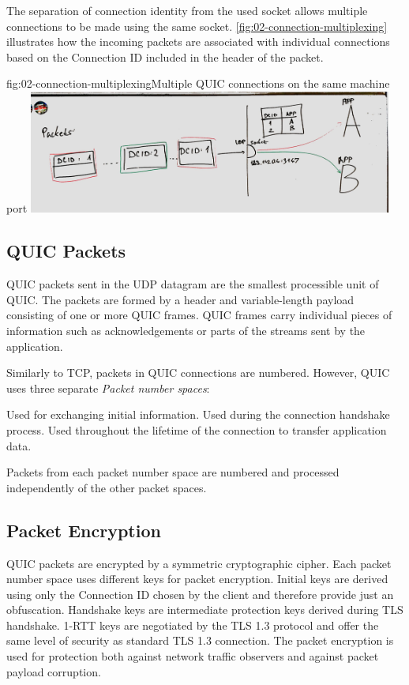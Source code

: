 The separation of connection identity from the used socket allows multiple connections to be made
using the same socket. \autoref{fig:02-connection-multiplexing} illustrates how the incoming
packets are associated with individual connections based on the Connection ID included in the header
of the packet.

\begin{myFigure}{fig:02-connection-multiplexing}{Multiple QUIC connections on the same machine port}
  \includegraphics[width=0.9\textwidth]{img/02-socket-multiplexing}
\end{myFigure}

\subsection{QUIC Packets}

QUIC packets sent in the UDP datagram are the smallest processible unit of QUIC\@. The packets are
formed by a header and variable-length payload consisting of one or more QUIC frames. QUIC frames
carry individual pieces of information such as acknowledgements or parts of the streams sent by
the application.

Similarly to TCP, packets in QUIC connections are numbered. However, QUIC uses three separate
\textit{Packet number spaces}:

\begin{enumerate}
   Used for exchanging initial information.
   Used during the connection handshake process.
   Used throughout the lifetime of the connection to transfer application data.
\end{enumerate}

Packets from each packet number space are numbered and processed independently of the other packet
spaces.

\subsection{Packet Encryption}

QUIC packets are encrypted by a symmetric cryptographic cipher. Each packet number space uses
different keys for packet encryption. Initial keys are derived using only the Connection ID chosen
by the client and therefore provide just an obfuscation. Handshake keys are intermediate protection
keys derived during TLS handshake. 1-RTT keys are negotiated by the TLS 1.3 protocol and offer the
same level of security as standard TLS 1.3 connection. The packet encryption is used for protection
both against network traffic observers and against packet payload corruption.

